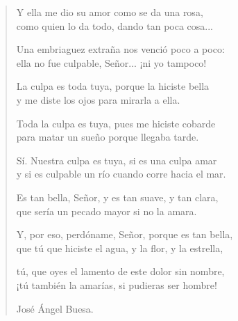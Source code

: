 \documentclass[11pt, portrait, twoside, notitlepage, openright]{book}
\begin{document}
\begin{verse}
Y ella me dio su amor como se da una rosa,\\
como quien lo da todo, dando tan poca cosa...
\newline

Una embriaguez extraña nos venció poco a poco:\\
ella no fue culpable, Señor... ¡ni yo tampoco!
\newline

La culpa es toda tuya, porque la hiciste bella\\
y me diste los ojos para mirarla a ella.
\newline

Toda la culpa es tuya, pues me hiciste cobarde\\
para matar un sueño porque llegaba tarde.
\newline

Sí. Nuestra culpa es tuya, si es una culpa amar\\
y si es culpable un río cuando corre hacia el mar.
\newline

Es tan bella, Señor, y es tan suave, y tan clara,\\
que sería un pecado mayor si no la amara.
\newpage

Y, por eso, perdóname, Señor, porque es tan bella,\\
que tú que hiciste el agua, y la flor, y la estrella,
\newline

tú, que oyes el lamento de este dolor sin nombre,\\
¡tú también la amarías, si pudieras ser hombre!
\newline

José Ángel Buesa.
\end{verse}
\end{document}
